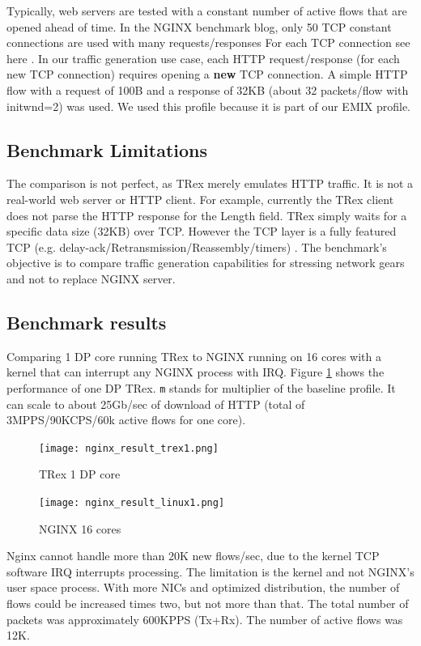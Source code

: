\documentclass[conference]{IEEEtran}
\begin{document}
Typically, web servers are tested with a constant number of active flows that are opened ahead of time. 
In the NGINX benchmark blog, only 50 TCP constant connections are used with many requests/responses 
For each TCP connection see here \cite{b6}. In our traffic generation use case, each HTTP request/response (for each new TCP connection) requires opening a \textbf{new} TCP connection. 
A simple HTTP flow with a request of 100B and a response of 32KB (about 32 packets/flow with initwnd=2) was used.
We used this profile because it is part of our EMIX profile. 

\subsection{Benchmark Limitations}

The comparison is not perfect, as TRex merely emulates HTTP traffic. 
It is not a real-world web server or HTTP client. For example, currently the TRex client does not parse the HTTP response for the Length field. 
TRex simply waits for a specific data size (32KB) over TCP. However the TCP layer is a fully featured TCP (e.g. delay-ack/Retransmission/Reassembly/timers) . 
The benchmark's objective is to compare traffic generation capabilities for stressing network gears and not to replace NGINX server. 

\subsection{Benchmark results}

Comparing 1 DP core running TRex to NGINX running on 16 cores with a kernel that can interrupt any NGINX process with IRQ. Figure \ref{fig:trex_nginx_r1} shows the performance of one DP TRex. \texttt{m} stands for multiplier of the baseline profile. 
It can scale to about 25Gb/sec of download of HTTP (total of 3MPPS/90KCPS/60k active flows for one core).

\begin{figure}[h]
  \texttt{[image: nginx\_result\_trex1.png]}
  \caption{TRex 1 DP core}
  \label{fig:trex_nginx_r1}
\end{figure}

\begin{figure}[h]
  \texttt{[image: nginx\_result\_linux1.png]}
  \caption{NGINX 16 cores}
  \label{fig:trex_nginx_r2}
\end{figure}

Nginx cannot handle more than 20K new flows/sec, due to the kernel TCP software IRQ interrupts processing. 
The limitation is the kernel and not NGINX's user space process.
With more NICs and optimized distribution, the number of flows could be increased times two, but not more than that. 
The total number of packets was approximately 600KPPS (Tx+Rx). The number of active flows was 12K.
\end{document}
